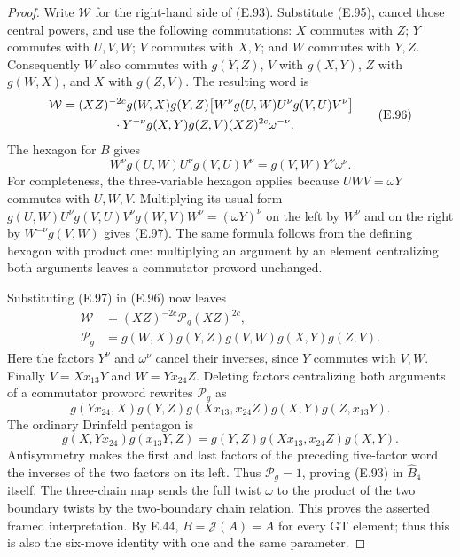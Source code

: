 \begin{proof}
Write $\mathcal W$ for the right-hand side of
(E.93).  Substitute (E.95), cancel those central
powers, and use the following commutations:
$X$ commutes with $Z$; $Y$ commutes with $U,V,W$;
$V$ commutes with $X,Y$; and $W$ commutes with
$Y,Z$.  Consequently $W$ also commutes with
$g(Y,Z)$, $V$ with $g(X,Y)$, $Z$ with $g(W,X)$,
and $X$ with $g(Z,V)$.
The resulting word is
\[
\begin{split}
\mathcal W={}&(XZ)^{-2c}g(W,X)g(Y,Z)
  \bigl[W^\nu g(U,W)U^\nu g(V,U)V^\nu\bigr]\\
 &\hspace{10mm}\cdot Y^{-\nu}g(X,Y)g(Z,V)
   (XZ)^{2c}\omega^{-\nu}.                            
\end{split}\tag{E.96}
\]
The hexagon for $B$ gives
\[
 W^\nu g(U,W)U^\nu g(V,U)V^\nu
                   =g(V,W)Y^\nu\omega^\nu.            \tag{E.97}
\]
For completeness, the three-variable hexagon
applies because $UWV=\omega Y$ commutes with
$U,W,V$.  Multiplying its usual form
$g(U,W)U^\nu g(V,U)V^\nu g(W,V)W^\nu
=(\omega Y)^\nu$ on the left by $W^\nu$ and
on the right by $W^{-\nu}g(V,W)$ gives (E.97).
The same formula follows from the defining
hexagon with product one: multiplying an
argument by an element centralizing both
arguments leaves a commutator proword
unchanged.

Substituting (E.97) in (E.96) now leaves
\[
\begin{split}
 \mathcal W&=(XZ)^{-2c}\mathcal P_g(XZ)^{2c},\\
 \mathcal P_g&=g(W,X)g(Y,Z)g(V,W)g(X,Y)g(Z,V).
\end{split}\tag{E.98}
\]
Here the factors $Y^\nu$ and $\omega^\nu$
cancel their inverses, since $Y$ commutes
with $V,W$.
Finally
$V=Xx_{13}Y$ and $W=Yx_{24}Z$.
Deleting factors centralizing both arguments
of a commutator proword rewrites $\mathcal P_g$ as
\[
 g(Yx_{24},X)g(Y,Z)
 g(Xx_{13},x_{24}Z)g(X,Y)g(Z,x_{13}Y).
\]
The ordinary Drinfeld pentagon is
\[
 g(X,Yx_{24})g(x_{13}Y,Z)
   =g(Y,Z)g(Xx_{13},x_{24}Z)g(X,Y).
\]
Antisymmetry makes the first and last factors
of the preceding five-factor word the inverses
of the two factors on its left.  Thus
$\mathcal P_g=1$, proving (E.93) in
$\widehat B_4$ itself.
The three-chain map sends the full twist
$\omega$ to the product of the two boundary
twists by the two-boundary chain relation.
This proves the asserted framed interpretation.
By E.44, $B=\mathcal J(A)=A$ for every GT
element; thus this is also the six-move identity
with one and the same parameter.
\end{proof}

